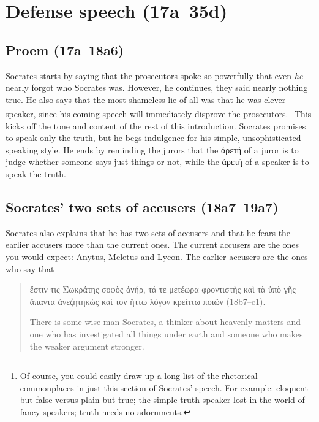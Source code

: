 \documentclass[11pt]{article}
\begin{document}

\section{Defense speech (17a--35d)}

\subsection{Proem (17a--18a6)}

Socrates starts by saying that the prosecutors spoke so powerfully that even \emph{he} nearly forgot who Socrates was.  However, he continues, they said nearly nothing true.   He also says that the most shameless lie of all was that he was clever speaker, since his coming speech will immediately disprove the prosecutors.\footnote{Of course, you could easily draw up a long list of the rhetorical commonplaces in just this section of Socrates' speech.  For example: eloquent but false versus plain but true; the simple truth-speaker lost in the world of fancy speakers; truth needs no adornments.}  This kicks off the tone and content of the rest of this introduction.  Socrates promises to speak only the truth, but he begs indulgence for his simple, unsophisticated speaking style.  He ends by reminding the jurors that the ἀρετή of a juror is to judge whether someone says just things or not, while the ἀρετή of a speaker is to speak the truth.

\subsection{Socrates' two sets of accusers (18a7--19a7)}

Socrates also explains that he has two sets of accusers and that he fears the earlier accusers more than the current ones.  The current accusers are the ones you would expect: Anytus, Meletus and Lycon.  The earlier accusers are the ones who say that

\begin{quote}
    ἔστιν τις Σωκράτης σοφὸς ἀνήρ, τά τε μετέωρα φροντιστὴς καὶ τὰ ὑπὸ γῆς ἅπαντα ἀνεζητηκὼς καὶ τὸν ἥττω λόγον κρείττω ποιῶν (18b7--c1).

    There is some wise man Socrates, a thinker about heavenly matters and one who has investigated all things under earth and someone who makes the weaker argument stronger.
\end{quote}
\end{document}
